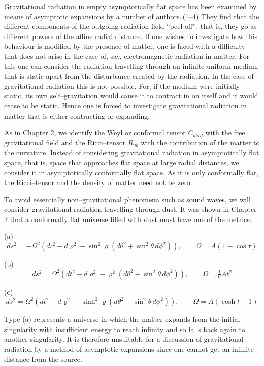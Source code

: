 Gravitational radiation in empty asymptotically flat 
space has been examined by means of asymptotic expansions 
by a number of authors.\,(1--4) They find that the different 
components of the outgoing radiation field ``peel off'', that 
is, they go as different powers of the affine radial distance.  
If one wishes to investigate how this behaviour is modified 
by the presence of matter, one is faced with a difficulty 
that does not arise in the case of, say, electromagnetic 
radiation in matter. For this one can consider the radiation 
travelling through an infinite uniform medium that is static 
apart from the disturbance created by the radiation. In the 
case of gravitational radiation this is not possible. For, 
if the medium were initially static, its own self–gravitation 
would cause it to contract in on itself and it would cease to 
be static. Hence one is forced to investigate gravitational 
radiation in matter that is either contracting or expanding.  

As in Chapter 2, we identify the Weyl or conformal 
tensor $C_{abcd}$ with the free gravitational field and the 
Ricci–tensor $R_{ab}$ with the contribution of the matter to the 
curvature. Instead of considering gravitational radiation in asymptotically flat space, that is, space that approaches 
flat space at large radial distances, we consider it in 
asymptotically conformally flat space. As it is only 
conformally flat, the Ricci–tensor and the density of matter 
need not be zero.  

To avoid essentially non–gravitational phenomena such 
as sound waves, we will consider gravitational radiation 
travelling through dust. It was shown in Chapter 2 that a 
conformally flat universe filled with dust must have one of 
the metrics:  

(a) 
\[
ds^{2} = -\Omega^{2}\left(d\iota^{2} - d\varrho^{2} - \sin^{2}\varrho \left(d\theta^{2} + \sin^{2}\theta\, d\phi^{2}\right)\right),
\qquad \Omega = A(1 - \cos \tau) \tag{1.1}
\]

(b) 
\[
ds^{2} = \Omega^{2}\left(dt^{2} - d\varrho^{2} - \varrho^{2}\left(d\theta^{2} + \sin^{2}\theta\, d\phi^{2}\right)\right),
\qquad \Omega = \tfrac{1}{6}A t^{2} \tag{1.2}
\]

(c) 
\[
ds^{2} = \Omega^{2}\left(dt^{2} - d\varrho^{2} - \sinh^{2}\varrho\left(d\theta^{2} + \sin^{2}\theta\, d\phi^{2}\right)\right),
\qquad \Omega = A(\cosh t - 1) \tag{1.3}
\]

Type (a) represents a universe in which the matter 
expands from the initial singularity with insufficient energy 
to reach infinity and so falls back again to another 
singularity. It is therefore unsuitable for a discussion of gravitational radiation by a method of asymptotic expansions 
since one cannot get an infinite distance from the source.  

